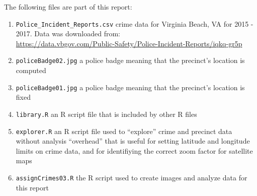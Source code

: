 The following files are part of this report:
\begin{enumerate}
\item \texttt{Police\_Incident\_Reports.csv} crime data for Virginia Beach, VA for 2015 - 2017.  Data was downloaded from:\\ \url{https://data.vbgov.com/Public-Safety/Police-Incident-Reports/iqkq-gr5p} 
  \item \texttt{policeBadge02.jpg} a police badge meaning that the precinct's location is computed 
  \item \texttt{policeBadge01.jpg} a police badge meaning that the precinct's location is fixed 
  \item \texttt{library.R} an R script file that is included by other R files  
  \item \texttt{explorer.R} an R script file used to ``explore'' crime and precinct data without analysis ``overhead'' that is useful for setting latitude and longitude limits on crime data, and for identifiying the correct zoom factor for satellite maps 
  \item \texttt{assignCrimes03.R} the R script used to create images and analyze data for this report 
\end{enumerate}

